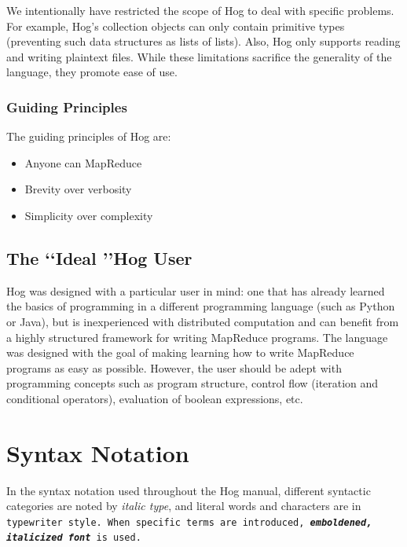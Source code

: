 \documentclass{article}
\begin{document}
We intentionally have restricted the scope of Hog to deal with specific problems.
For example, Hog's collection objects can only contain primitive types (preventing
such data structures as lists of lists). Also, Hog only supports reading and
writing plaintext files. While these limitations sacrifice the generality of the
language, they promote ease of use.

\subsubsection{Guiding Principles} %
\label{ssub:guiding_principles}

The guiding principles of Hog are:

\begin{itemize}
  \item Anyone can MapReduce
  \item Brevity over verbosity
  \item Simplicity over complexity
\end{itemize}



\subsection{The \lq\lq Ideal \rq\rq Hog User} %
\label{sub:the_ideal_hog_user}

Hog was designed with a particular user in mind: one that has already learned the basics of programming in a different
programming language (such as Python or Java), but is inexperienced with distributed computation and can benefit from a highly structured framework for writing MapReduce programs. The language was designed with the goal of making learning how to write MapReduce programs as easy as possible. However, the user should be adept with programming concepts such as program structure, control flow (iteration and conditional operators), evaluation of boolean expressions, etc.



\section{Syntax Notation} %
\label{sec:syntax_notation}

In the syntax notation used throughout the Hog manual, different syntactic categories are noted by \emph{italic type}, and
literal words and characters are in \tt typewriter style\rm. When specific terms are introduced, \textbf{\emph{emboldened,
italicized font}} is used.
\end{document}
